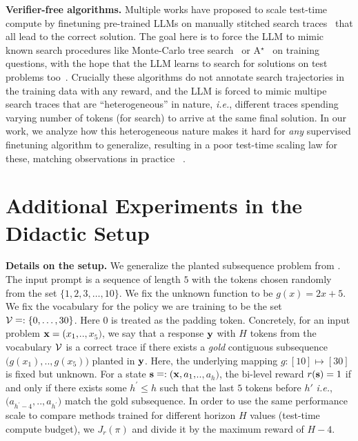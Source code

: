 \textbf{Verifier-free algorithms.} Multiple works have proposed to scale test-time compute by finetuning pre-trained LLMs on manually stitched search traces~\cite{gandhi2024stream,nie2024evolve} that all lead to the correct solution. The goal here is to force the LLM to mimic known search procedures like Monte-Carlo tree search~\cite{yang2022chain,xie2024monte} or A$^\star$~\cite{lehnert2024beyond} on training questions, with the hope that the LLM learns to search for solutions on test problems too~\cite{sel2023algorithm}. Crucially these algorithms do not annotate search trajectories in the training data with any reward, and the LLM is forced to mimic multipe search traces that are ``heterogeneous'' in nature, \textit{i.e.}, different traces spending varying number of tokens (for search) to arrive at the same final solution. In our work, we analyze how this heterogeneous nature makes it hard for \emph{any} supervised finetuning algorithm to generalize, resulting in a poor test-time scaling law for these,  matching observations in practice ~\citep{kumar2024training,xiang2025towards}.







\section{Additional Experiments in the Didactic Setup}
\label{sec:additional-didactic}




\textbf{Details on the setup.} We generalize the planted subsequence problem from \cite{setlur2024rewarding}. The input prompt is a sequence of length $5$ with the tokens chosen randomly from the set $\{1,2, 3,\ldots,10\}$. We fix the unknown function to be $g(x)=2x+5$. We fix the vocabulary for the policy we are training to be the set ${\mathcal{V}} \mathrel{\mathop=}: \{0, \ldots, 30\}$.  Here $0$ is treated as the padding token. 
Concretely, for an input problem  $\mathbf{x} = (x_1,$$..$$, x_5)$, we say that a response $\mathbf{y}$ with $H$ tokens from the vocabulary ${\mathcal{V}}$  
is a correct trace if there exists a \emph{gold} contiguous subsequence $(g(x_1),$$..,$$g(x_{5}))$ planted in $\mathbf{y}$. Here, the underlying mapping $g:$$[10]$$\mapsto$$[30]$ is fixed but unknown.  For a state $\mathbf{s} \mathrel{\mathop=}: (\mathbf{x}, a_1,$$ ..$$, a_h)$, the bi-level reward $r(\mathbf{s}) = 1$ if and only if there exists some $h^\prime \leq h$ such that the last $5$ tokens before $h'$ \textit{i.e.},  $(a_{h^\prime - 4},$$..,$$a_{h^\prime})$
match the gold subsequence.  In order to use the same performance scale to compare  methods trained for different horizon $H$ values (test-time compute budget), we  $J_r(\pi)$ and divide it by the maximum reward of $H-4$. 


